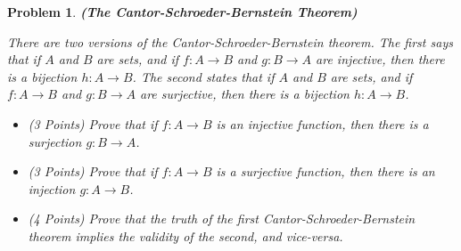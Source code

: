 \documentclass{article}
\theoremstyle{normal}
\newtheorem{problem}{Problem}
\begin{document}
    \begin{problem}
        \textbf{(The Cantor-Schroeder-Bernstein Theorem)}
        \par\hfill\par
        There are two versions of the Cantor-Schroeder-Bernstein theorem. The
        first says that if $A$ and $B$ are sets, and if $f:A\rightarrow{B}$ and
        $g:B\rightarrow{A}$ are injective, then there is a bijection
        $h:A\rightarrow{B}$. The second states that if
        $A$ and $B$ are sets, and if $f:A\rightarrow{B}$ and $g:B\rightarrow{A}$
        are surjective, then there is a bijection $h:A\rightarrow{B}$.
        \begin{itemize}
            \item (3 Points) Prove that if $f:A\rightarrow{B}$ is an injective
                function, then there is a surjection $g:B\rightarrow{A}$.
            \item (3 Points) Prove that if $f:A\rightarrow{B}$ is a surjective
                function, then there is an injection $g:A\rightarrow{B}$.
            \item (4 Points) Prove that the truth of the first
                Cantor-Schroeder-Bernstein theorem implies the validity of the
                second, and vice-versa.
        \end{itemize}
    \end{problem}
\end{document}
